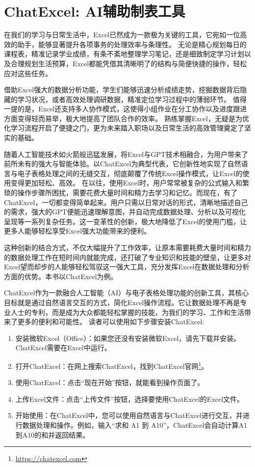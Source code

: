 \section{ChatExcel: AI辅助制表工具}\label{sec:Excel}

在我们的学习与日常生活中，Excel已然成为一款极为关键的工具，它宛如一位高效的助手，能够显著提升各项事务的处理效率与条理性。
无论是精心规划每日的课程表，精准记录学业成绩，有条不紊地整理学习笔记，还是细致制定学习计划以及合理规划生活预算，Excel都能凭借其清晰明了的结构与简便快捷的操作，轻松应对这些任务。

借助Excel强大的数据分析功能，学生们能够迅速分析成绩走势，挖掘数据背后隐藏的学习状况，或者高效处理调研数据，精准定位学习过程中的薄弱环节。
值得一提的是，Excel还支持多人协作模式，这使得小组作业在分工协作以及进度跟进方面变得轻而易举，极大地提高了团队合作的效率。
熟练掌握Excel，无疑是为优化学习流程开启了便捷之门，更为未来踏入职场以及日常生活的高效管理奠定了坚实的基础。

随着人工智能技术如火箭般迅猛发展，将Excel与GPT技术相融合，为用户带来了前所未有的强大与智能体验。以ChatExcel为典型代表，它创新性地实现了自然语言与电子表格处理之间的无缝交互，彻底颠覆了传统Excel操作模式，让Excel的使用变得更加轻松、高效。
在以往，使用Excel时，用户常常被复杂的公式输入和繁琐的操作步骤所困扰，需要花费大量时间和精力去学习和记忆。而现在，有了ChatExcel，一切都变得简单起来。用户只需以日常对话的形式，清晰地描述自己的需求，强大的GPT便能迅速理解意图，并自动完成数据处理、分析以及可视化呈现等一系列复杂任务。这一变革性的创新，极大地降低了Excel的使用门槛，让更多人能够轻松享受Excel强大功能带来的便利。

这种创新的结合方式，不仅大幅提升了工作效率，让原本需要耗费大量时间和精力的数据处理工作在短时间内就能完成，还打破了专业知识和技能的壁垒，让更多对Excel望而却步的人能够轻松驾驭这一强大工具，充分发挥Excel在数据处理和分析方面的优势。本书以ChatExcel为例。

ChatExcel作为一款融合人工智能（AI）与电子表格处理功能的创新工具，其核心目标就是通过自然语言交互的方式，简化Excel操作流程。它让数据处理不再是专业人士的专利，而是成为大众都能轻松掌握的技能，为我们的学习、工作和生活带来了更多的便利和可能性。
读者可以使用如下步骤安装ChatExcel:

\begin{enumerate}
    \item 安装微软Excel（Office）：如果您还没有安装微软Excel，请先下载并安装。ChatExcel需要在Excel中运行。
    \item 打开ChatExcel：在网上搜索ChatExcel，找到ChatExcel官网\footnote{\url{https://chatexcel.com}}。
    \item 使用ChatExcel：点击“现在开始”按钮，就能看到操作页面了。
    \item 上传Excel文件：点击“上传文件”按钮，选择要使用ChatExcel的Excel文件。
    \item 开始使用：在ChatExcel中，您可以使用自然语言与ChatExcel进行交互，并进行数据处理和操作。例如，输入“求和 A1 到 A10”，ChatExcel会自动计算A1到A10的和并返回结果。
\end{enumerate}

